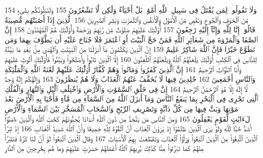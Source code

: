 {\tiny\colorbox{cl_aya}{154}} وَلَا تَقُولُوا۟ لِمَن يُقْتَلُ فِى سَبِيلِ ٱللَّهِ أَمْوَٰتٌۢ بَلْ أَحْيَآءٌ وَلَٰكِن لَّا تَشْعُرُونَ
{\tiny\colorbox{cl_aya}{155}} وَلَنَبْلُوَنَّكُم بِشَىْءٍ مِّنَ ٱلْخَوْفِ وَٱلْجُوعِ وَنَقْصٍ مِّنَ ٱلْأَمْوَٰلِ وَٱلْأَنفُسِ وَٱلثَّمَرَٰتِ وَبَشِّرِ ٱلصَّٰبِرِينَ
{\tiny\colorbox{cl_aya}{156}} ٱلَّذِينَ إِذَآ أَصَٰبَتْهُم مُّصِيبَةٌ قَالُوٓا۟ إِنَّا لِلَّهِ وَإِنَّآ إِلَيْهِ رَٰجِعُونَ
{\tiny\colorbox{cl_aya}{157}} أُو۟لَٰٓئِكَ عَلَيْهِمْ صَلَوَٰتٌ مِّن رَّبِّهِمْ وَرَحْمَةٌ وَأُو۟لَٰٓئِكَ هُمُ ٱلْمُهْتَدُونَ
{\tiny\colorbox{cl_aya}{158}} إِنَّ ٱلصَّفَا وَٱلْمَرْوَةَ مِن شَعَآئِرِ ٱللَّهِ فَمَنْ حَجَّ ٱلْبَيْتَ أَوِ ٱعْتَمَرَ فَلَا جُنَاحَ عَلَيْهِ أَن يَطَّوَّفَ بِهِمَا وَمَن تَطَوَّعَ خَيْرًا فَإِنَّ ٱللَّهَ شَاكِرٌ عَلِيمٌ
{\tiny\colorbox{cl_aya}{159}} إِنَّ ٱلَّذِينَ يَكْتُمُونَ مَآ أَنزَلْنَا مِنَ ٱلْبَيِّنَٰتِ وَٱلْهُدَىٰ مِنۢ بَعْدِ مَا بَيَّنَّٰهُ لِلنَّاسِ فِى ٱلْكِتَٰبِ أُو۟لَٰٓئِكَ يَلْعَنُهُمُ ٱللَّهُ وَيَلْعَنُهُمُ ٱللَّٰعِنُونَ
{\tiny\colorbox{cl_aya}{160}} إِلَّا ٱلَّذِينَ تَابُوا۟ وَأَصْلَحُوا۟ وَبَيَّنُوا۟ فَأُو۟لَٰٓئِكَ أَتُوبُ عَلَيْهِمْ وَأَنَا ٱلتَّوَّابُ ٱلرَّحِيمُ
{\tiny\colorbox{cl_aya}{161}} إِنَّ ٱلَّذِينَ كَفَرُوا۟ وَمَاتُوا۟ وَهُمْ كُفَّارٌ أُو۟لَٰٓئِكَ عَلَيْهِمْ لَعْنَةُ ٱللَّهِ وَٱلْمَلَٰٓئِكَةِ وَٱلنَّاسِ أَجْمَعِينَ
{\tiny\colorbox{cl_aya}{162}} خَٰلِدِينَ فِيهَا لَا يُخَفَّفُ عَنْهُمُ ٱلْعَذَابُ وَلَا هُمْ يُنظَرُونَ
{\tiny\colorbox{cl_aya}{163}} وَإِلَٰهُكُمْ إِلَٰهٌ وَٰحِدٌ لَّآ إِلَٰهَ إِلَّا هُوَ ٱلرَّحْمَٰنُ ٱلرَّحِيمُ
{\tiny\colorbox{cl_aya}{164}} إِنَّ فِى خَلْقِ ٱلسَّمَٰوَٰتِ وَٱلْأَرْضِ وَٱخْتِلَٰفِ ٱلَّيْلِ وَٱلنَّهَارِ وَٱلْفُلْكِ ٱلَّتِى تَجْرِى فِى ٱلْبَحْرِ بِمَا يَنفَعُ ٱلنَّاسَ وَمَآ أَنزَلَ ٱللَّهُ مِنَ ٱلسَّمَآءِ مِن مَّآءٍ فَأَحْيَا بِهِ ٱلْأَرْضَ بَعْدَ مَوْتِهَا وَبَثَّ فِيهَا مِن كُلِّ دَآبَّةٍ وَتَصْرِيفِ ٱلرِّيَٰحِ وَٱلسَّحَابِ ٱلْمُسَخَّرِ بَيْنَ ٱلسَّمَآءِ وَٱلْأَرْضِ لَءَايَٰتٍ لِّقَوْمٍ يَعْقِلُونَ
{\tiny\colorbox{cl_aya}{165}} وَمِنَ ٱلنَّاسِ مَن يَتَّخِذُ مِن دُونِ ٱللَّهِ أَندَادًا يُحِبُّونَهُمْ كَحُبِّ ٱللَّهِ وَٱلَّذِينَ ءَامَنُوٓا۟ أَشَدُّ حُبًّا لِّلَّهِ وَلَوْ يَرَى ٱلَّذِينَ ظَلَمُوٓا۟ إِذْ يَرَوْنَ ٱلْعَذَابَ أَنَّ ٱلْقُوَّةَ لِلَّهِ جَمِيعًا وَأَنَّ ٱللَّهَ شَدِيدُ ٱلْعَذَابِ
{\tiny\colorbox{cl_aya}{166}} إِذْ تَبَرَّأَ ٱلَّذِينَ ٱتُّبِعُوا۟ مِنَ ٱلَّذِينَ ٱتَّبَعُوا۟ وَرَأَوُا۟ ٱلْعَذَابَ وَتَقَطَّعَتْ بِهِمُ ٱلْأَسْبَابُ
{\tiny\colorbox{cl_aya}{167}} وَقَالَ ٱلَّذِينَ ٱتَّبَعُوا۟ لَوْ أَنَّ لَنَا كَرَّةً فَنَتَبَرَّأَ مِنْهُمْ كَمَا تَبَرَّءُوا۟ مِنَّا كَذَٰلِكَ يُرِيهِمُ ٱللَّهُ أَعْمَٰلَهُمْ حَسَرَٰتٍ عَلَيْهِمْ وَمَا هُم بِخَٰرِجِينَ مِنَ ٱلنَّارِ
